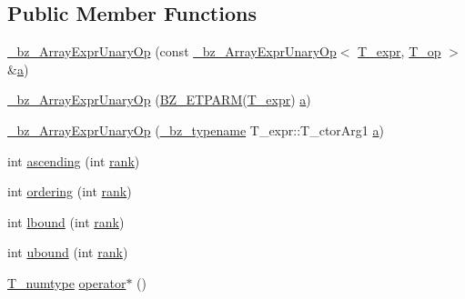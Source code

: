 \subsection*{Public Member Functions}
\begin{DoxyCompactItemize}
\item 
\hyperlink{class__bz__ArrayExprUnaryOp_af8bbfb954f5a79af06149226de860e0d}{\+\_\+bz\+\_\+\+Array\+Expr\+Unary\+Op} (const \hyperlink{class__bz__ArrayExprUnaryOp}{\+\_\+bz\+\_\+\+Array\+Expr\+Unary\+Op}$<$ \hyperlink{class__bz__ArrayExprUnaryOp_aa7e8d93e795781e0f9bed0120b380365}{T\+\_\+expr}, \hyperlink{class__bz__ArrayExprUnaryOp_a3d3a509583d155eab8772ca247985bc7}{T\+\_\+op} $>$ \&\hyperlink{gen__mat5files_8m_aae328bf20413f220e38aec4d95bfd6da}{a})
\item 
\hyperlink{class__bz__ArrayExprUnaryOp_ae853223cf88b543cff743c825277c77d}{\+\_\+bz\+\_\+\+Array\+Expr\+Unary\+Op} (\hyperlink{tuning_8h_a92a6f3aa8f4cd5ac9b4239c449892bb7}{B\+Z\+\_\+\+E\+T\+P\+A\+R\+M}(\hyperlink{class__bz__ArrayExprUnaryOp_aa7e8d93e795781e0f9bed0120b380365}{T\+\_\+expr}) \hyperlink{gen__mat5files_8m_aae328bf20413f220e38aec4d95bfd6da}{a})
\item 
\hyperlink{class__bz__ArrayExprUnaryOp_a7ab85aa38639985d8b84b055b879e521}{\+\_\+bz\+\_\+\+Array\+Expr\+Unary\+Op} (\hyperlink{compiler_8h_a1bc40add3e72effc9cf69dbe445cbdfd}{\+\_\+bz\+\_\+typename} T\+\_\+expr\+::\+T\+\_\+ctor\+Arg1 \hyperlink{gen__mat5files_8m_aae328bf20413f220e38aec4d95bfd6da}{a})
\item 
int \hyperlink{class__bz__ArrayExprUnaryOp_a906b4e4482a22c0892c92d4de9f3dc12}{ascending} (int \hyperlink{class__bz__ArrayExprUnaryOp_aa736afcc97edc921e07290cb8c822555}{rank})
\item 
int \hyperlink{class__bz__ArrayExprUnaryOp_a6f4b663cf4a466b7128b64a0087b094d}{ordering} (int \hyperlink{class__bz__ArrayExprUnaryOp_aa736afcc97edc921e07290cb8c822555}{rank})
\item 
int \hyperlink{class__bz__ArrayExprUnaryOp_ae6131b745ec02bd79fa7d88067349d69}{lbound} (int \hyperlink{class__bz__ArrayExprUnaryOp_aa736afcc97edc921e07290cb8c822555}{rank})
\item 
int \hyperlink{class__bz__ArrayExprUnaryOp_a80582b89f0fbd7027f1b25055d043957}{ubound} (int \hyperlink{class__bz__ArrayExprUnaryOp_aa736afcc97edc921e07290cb8c822555}{rank})
\item 
\hyperlink{class__bz__ArrayExprUnaryOp_a89bf264c814e1fa55026c4389ad34085}{T\+\_\+numtype} \hyperlink{class__bz__ArrayExprUnaryOp_ad06d59f7b61db9d8393461dc3c68ae2f}{operator$\ast$} ()

\end{DoxyCompactItemize}
